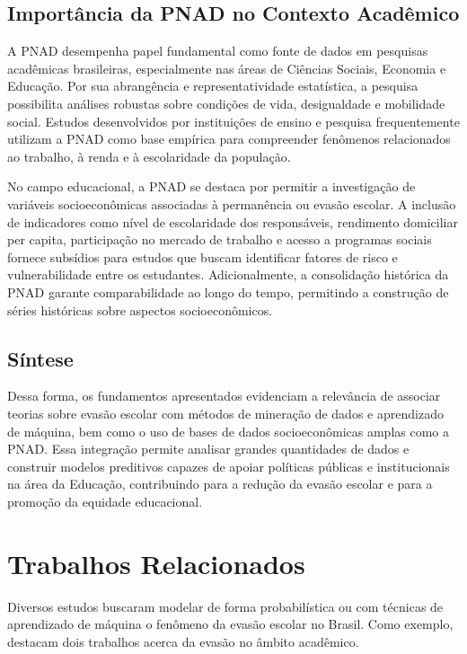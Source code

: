 \documentclass[english, spanish, brazilian]{RBIEarticle} %
\begin{document}
\subsection{Importância da PNAD no Contexto Acadêmico}
A PNAD desempenha papel fundamental como fonte de dados em pesquisas acadêmicas brasileiras, especialmente nas áreas de Ciências Sociais, Economia e Educação. Por sua abrangência e representatividade estatística, a pesquisa possibilita análises robustas sobre condições de vida, desigualdade e mobilidade social. Estudos desenvolvidos por instituições de ensino e pesquisa frequentemente utilizam a PNAD como base empírica para compreender fenômenos relacionados ao trabalho, à renda e à escolaridade da população.

No campo educacional, a PNAD se destaca por permitir a investigação de variáveis socioeconômicas associadas à permanência ou evasão escolar. A inclusão de indicadores como nível de escolaridade dos responsáveis, rendimento domiciliar per capita, participação no mercado de trabalho e acesso a programas sociais fornece subsídios para estudos que buscam identificar fatores de risco e vulnerabilidade entre os estudantes. Adicionalmente, a consolidação histórica da PNAD garante comparabilidade ao longo do tempo, permitindo a construção de séries históricas sobre aspectos socioeconômicos.

\subsection{Síntese}
Dessa forma, os fundamentos apresentados evidenciam a relevância de associar teorias sobre evasão escolar com métodos de mineração de dados e aprendizado de máquina, bem como o uso de bases de dados socioeconômicas amplas como a PNAD. Essa integração permite analisar grandes quantidades de dados e construir modelos preditivos capazes de apoiar políticas públicas e institucionais na área da Educação, contribuindo para a redução da evasão escolar e para a promoção da equidade educacional.

\section{Trabalhos Relacionados}
Diversos estudos buscaram modelar de forma probabilística ou com técnicas de aprendizado de
máquina o fenômeno da evasão escolar no Brasil. Como exemplo, destacam dois trabalhos acerca
da evasão no âmbito acadêmico.
\end{document}
